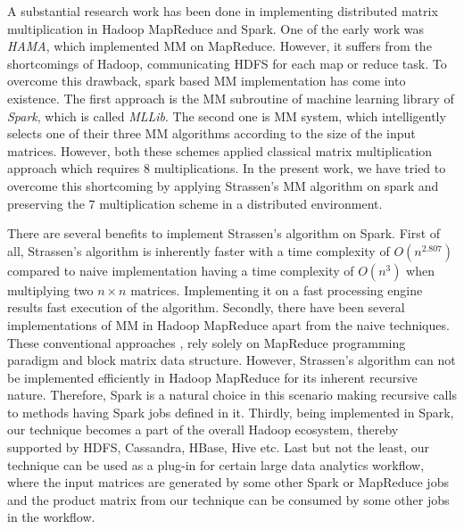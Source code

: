 A substantial research work has been done in implementing distributed matrix multiplication in Hadoop MapReduce and Spark. One of the early work was \textit{HAMA}, which implemented MM on MapReduce. However, it suffers from the shortcomings of Hadoop, communicating HDFS for each map or reduce task. To overcome this drawback, spark based MM implementation has come into existence. The first approach is the MM subroutine of machine learning library of \textit{Spark}, which is called \textit{MLLib}. The second one is MM system, which intelligently selects one of their three MM algorithms according to the size of the input matrices. However, both these schemes applied classical matrix multiplication approach which requires $8$ multiplications. In the present work, we have tried to overcome this shortcoming by applying Strassen's MM algorithm on spark and preserving the $7$ multiplication scheme in a distributed environment.

There are several benefits to implement Strassen's algorithm on Spark. First of all, Strassen's algorithm is inherently faster with a time complexity of $O(n^{2.807})$ compared to naive implementation having a time complexity of $O(n^{3})$ when multiplying two $n \times n$ matrices. Implementing it on a fast processing engine results fast execution of the algorithm. Secondly, there have been several implementations of MM in Hadoop MapReduce apart from the naive techniques. These conventional approaches \cite{huang2015cumulon,seo2010hama}, rely solely on MapReduce programming paradigm and block matrix data structure. However, Strassen's algorithm can not be implemented efficiently in Hadoop MapReduce for its inherent recursive nature. Therefore, Spark is a natural choice in this scenario making recursive calls to methods having Spark jobs defined in it. Thirdly, being implemented in Spark, our technique becomes a part of the overall Hadoop ecosystem, thereby supported by HDFS, Cassandra, HBase, Hive etc. Last but not the least, our technique can be used as a plug-in for certain large data analytics workflow, where the input matrices are generated by some other Spark or MapReduce jobs and the product matrix from our technique can be consumed by some other jobs in the workflow.


